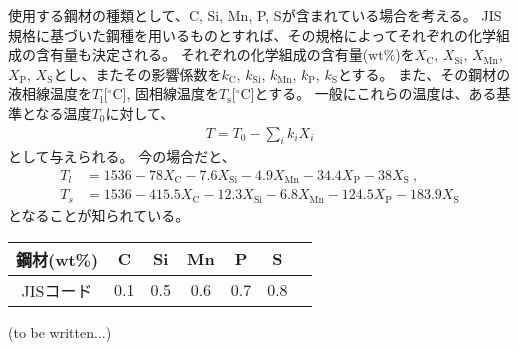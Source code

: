 


使用する鋼材の種類として、C, Si, Mn, P, Sが含まれている場合を考える。
JIS規格に基づいた鋼種を用いるものとすれば、その規格によってそれぞれの化学組成の含有量も決定される。
それぞれの化学組成の含有量($\mathrm{wt}\%$)を$X_\mathrm C$, $X_\mathrm{Si}$, $X_\mathrm{Mn}$, $X_\mathrm P$, $X_\mathrm S$とし、またその影響係数を$k_\mathrm C$, $k_\mathrm{Si}$, $k_\mathrm{Mn}$, $k_\mathrm P$, $k_\mathrm S$とする。
また、その鋼材の液相線温度を$T_\mathrm l$[$^\circ\mathrm C$], 固相線温度を$T_\mathrm s$[$^\circ\mathrm C$]とする。
一般にこれらの温度は、ある基準となる温度$T_0$に対して、
\begin{align*}
  T = T_0-\sum_i k_iX_i
\end{align*}
として与えられる。
今の場合だと、
\begin{align*}
  T_l
  &= 1536-78X_\mathrm C-7.6X_\mathrm{Si}-4.9X_\mathrm{Mn}-34.4X_\mathrm P-38X_\mathrm S~,\\
  T_s
  &= 1536-415.5X_\mathrm C-12.3X_\mathrm{Si}-6.8X_\mathrm{Mn}-124.5X_\mathrm P-183.9X_\mathrm S
\end{align*}
となることが知られている\cite{1986KO}。\\
\begin{tabular}[t]{|c|c|c|c|c|c|c|}
  \hline
  鋼材(wt\%) & C & Si & Mn & P & S
  \\\hline
  \index{JISコード}JISコード & 0.1 & 0.5 & 0.6 & 0.7 & 0.8
  \\\hline
\end{tabular}


\clearpage
(to be written...)